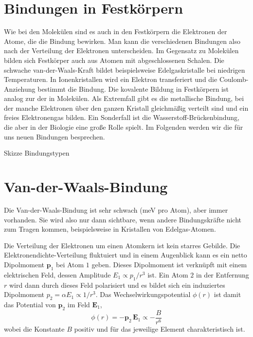 \section{Bindungen in Festkörpern}



Wie bei den Molekülen  sind es auch in den Festkörpern die Elektronen der Atome, die die Bindung bewirken. Man kann die verschiedenen Bindungen also nach der Verteilung der Elektronen unterscheiden. Im Gegensatz zu Molekülen bilden sich Festkörper auch aus Atomen mit abgeschlossenen Schalen. Die schwache van-der-Waals-Kraft bildet beispielsweise Edelgaskristalle bei niedrigen Temperaturen. In Ionenkristallen wird ein Elektron transferiert und die Coulomb-Anziehung  bestimmt die Bindung. Die kovalente Bildung in Festkörpern ist analog zur der in Molekülen. Als Extremfall gibt es die metallische Bindung, bei der manche Elektronen über den ganzen Kristall gleichmäßig verteilt sind und  ein freies Elektronengas bilden. Ein Sonderfall ist die Wasserstoff-Brückenbindung, die aber in der Biologie eine große Rolle spielt. Im Folgenden werden wir die für uns neuen  Bindungen besprechen.

\begin{marginfigure}

\caption{Skizze Bindungstypen}
\end{marginfigure}



\section{Van-der-Waals-Bindung}

Die Van-der-Waals-Bindung ist sehr schwach (meV pro Atom), aber immer vorhanden. Sie wird also nur dann sichtbare, wenn andere Bindungskräfte nicht zum Tragen kommen, beispielsweise in Kristallen von Edelgas-Atomen.

Die Verteilung der Elektronen um einen Atomkern ist kein starres Gebilde. Die Elektronendichte-Verteilung fluktuiert und in einem Augenblick kann es ein netto Dipolmoment $\mathbf{p}_1$ bei Atom $1$ geben. Dieses Dipolmoment ist verknüpft mit einem elektrischen Feld, dessen Amplitude $E_1 \propto p_1 / r^3$ ist. Ein Atom $2$ in der Entfernung $r$ wird dann durch dieses Feld polarisiert und es bildet sich ein induziertes Dipolmoment $p_2 = \alpha E_1 \propto 1/r^3$. Das Wechselwirkungspotential $\phi(r)$ ist damit das Potential von $\mathbf{p}_2$ im Feld $\mathbf{E}_1$, 
\begin{equation}
 \phi(r) = - \mathbf{p}_2 \, \mathbf{E}_1 \propto - \frac{B}{r^6}
\end{equation}
wobei die Konstante $B$ positiv und für das jeweilige Element charakteristisch ist.

